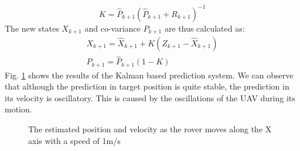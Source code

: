 \documentclass[conf]{new-aiaa}
\begin{document}
\begin{equation}
    K = \hat{P}_{k+1}(\hat{P}_{k+1}+R_{k+1})^{-1}
\end{equation}
The new states $X_{k+1}$ and co-variance $P_{k+1}$ are thus calculated as:
\begin{eqnarray}
    X_{k+1} = \hat{X}_{k+1} + K(Z_{k+1} - \hat{X}_{k+1})\\
    P_{k+1} = \hat{P}_{k+1}(1-K)
\end{eqnarray}
Fig. \ref{fig:kalman} shows the results of the Kalman based prediction system. We can observe that although the prediction in target position is quite stable, the prediction in its velocity is oscillatory. This is caused by the oscillations of the UAV during its motion.

\begin{figure}[htb]
\begin{minipage}{0.5\textwidth}
\end{minipage}%
\begin{minipage}{0.5\textwidth}
\end{minipage}%
\caption{The estimated position and velocity as the rover moves along the X axis with a speed of 1m/s} \label{fig:kalman}
\end{figure}
\end{document}
